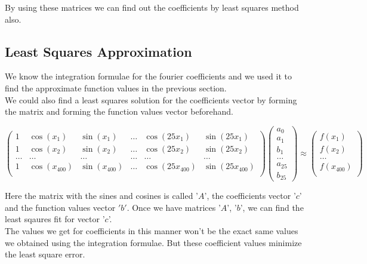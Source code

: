 \documentclass[12pt, a4paper]{article}
\begin{document}
By using these matrices we can find out the coefficients by least squares method also.

\subsection{Least Squares Approximation}
We know the integration formulae for the fourier coefficients and we used it
to find the approximate function values in the previous section.\\
We could also find a least squares solution for the coefficients vector by forming the matrix and
forming the function values vector beforehand.

\begin{equation*}
    \begin{pmatrix}
        1 & \cos(x_{1}) & \sin(x_{1}) & \ldots & \cos(25x_{1}) & \sin(25x_{1}) \\
        1 & \cos(x_{2}) & \sin(x_{2}) & \ldots & \cos(25x_{2}) & \sin(25x_{2}) \\
        \ldots & \ldots & \ldots & \ldots & \ldots & \ldots \\
        1 & \cos(x_{400}) & \sin(x_{400}) & \ldots & \cos(25x_{400}) & \sin(25x_{400}) \\
    \end{pmatrix}
    \begin{pmatrix}
        a_{0} \\
        a_{1} \\
        b_{1} \\
        \ldots \\
        a_{25} \\
        b_{25}
    \end{pmatrix}
    \approx
    \begin{pmatrix}
        f(x_{1}) \\
        f(x_{2}) \\
        \ldots \\
        f(x_{400}) \\
    \end{pmatrix}
\end{equation*}

Here the matrix with the sines and cosines is called '$A$', the coefficients vector '$c$'
and the function values vector $'b'$. Once we have matrices '$A$', '$b$', we can find
the least sqaures fit for vector '$c$'.\\ 
The values we get for coefficients in this manner won't
be the exact same values we obtained using the integration formulae. But these coefficient values
minimize the least square error.
\clearpage
\end{document}
